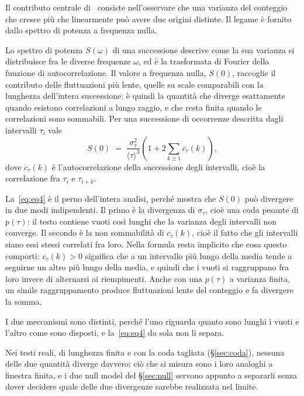 Il contributo centrale di~\cite{altmann2012} consiste nell'osservare che una
varianza del conteggio che cresce più che linearmente può avere due origini
distinte. Il legame è fornito dallo spettro di potenza a frequenza nulla.

Lo spettro di potenza $S(\omega)$ di una successione descrive come la sua
varianza si distribuisce fra le diverse frequenze $\omega$, ed è la trasformata
di Fourier della funzione di autocorrelazione. Il valore a frequenza nulla,
$S(0)$, raccoglie il contributo delle fluttuazioni più lente, quelle su scale
comparabili con la lunghezza dell'intera successione: è quindi la quantità che
diverge esattamente quando esistono correlazioni a lungo raggio, e che resta
finita quando le correlazioni sono sommabili. Per una successione di occorrenze
descritta dagli intervalli $\tau_i$ vale
\begin{equation}
  S(0) \;=\; \frac{\sigma_\tau^2}{\langle\tau\rangle^3}
  \left(1 + 2\sum_{k\ge1} c_\tau(k)\right),
  \label{eq:eq4}
\end{equation}
dove $c_\tau(k)$ è l'autocorrelazione della successione degli intervalli, cioè
la correlazione fra $\tau_i$ e $\tau_{i+k}$.

La~\eqref{eq:eq4} è il perno dell'intera analisi, perché mostra che $S(0)$ può
divergere in due modi indipendenti. Il primo è la divergenza di $\sigma_\tau$,
cioè una coda pesante di $p(\tau)$: il testo contiene vuoti così lunghi che la
varianza degli intervalli non converge. Il secondo è la non sommabilità di
$c_\tau(k)$, cioè il fatto che gli intervalli siano essi stessi correlati fra
loro. Nella formula resta implicito che cosa questo comporti: $c_\tau(k) > 0$
significa che a un intervallo più lungo della media tende a seguirne un altro
più lungo della media, e quindi che i vuoti si
raggruppano fra loro invece di alternarsi ai riempimenti. Anche con una
$p(\tau)$ a varianza finita, un simile raggruppamento produce fluttuazioni
lente del conteggio e fa divergere la somma.

I due meccanismi sono distinti, perché l'uno riguarda quanto sono lunghi i
vuoti e l'altro come sono disposti, e la~\eqref{eq:eq4} da sola non li separa.

Nei testi reali, di lunghezza finita e con la coda tagliata
(§\ref{sec:coda}), nessuna delle due quantità diverge davvero: ciò che si
misura sono i loro analoghi a finestra finita, e i due null model del
§\ref{sec:null} servono appunto a separarli senza dover decidere quale delle
due divergenze sarebbe realizzata nel limite.

